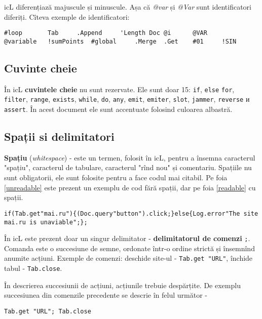 icL diferențiază majuscule și minuscule. Așa că \textit{@var} și \textit{@Var} sunt identificatori diferiți. Cîteva exemple de identificatori:

\begin{lstlisting}[numbers=none]
#loop		Tab		.Append		'Length	Doc	@i	 	@VAR
@variable	!sumPoints	#global		.Merge	.Get	#01		!SIN
\end{lstlisting}

\subsection{Cuvinte cheie}

În icL \textbf{cuvintele cheie} nu sunt rezervate. Ele sunt doar 15: \lstinline|if|, \lstinline|else| \lstinline|for|, \lstinline|filter|, \lstinline|range|, \lstinline|exists|, \lstinline|while|, \lstinline|do|, \lstinline|any|, \lstinline|emit|, \lstinline|emiter|, \lstinline|slot|, \lstinline|jammer|, \lstinline|reverse| и \lstinline|assert|. În acest document ele sunt accentuate folosind culoarea albastră.

\subsection{Spații si delimitatori}

\textbf{Spațiu} (\textit{whitespace}) - este un termen, folosit în icL, pentru a însemna caracterul "spațiu", caracterul de tabulare, caracterul "rînd nou" și comentariu. Spațiile nu sunt obligatorii, ele sunt folosite pentru a face codul mai citabil. Pe foia \ref{unreadable} este prezent un exemplu de cod fără spații, dar pe foia \ref{readable} cu spații.

\begin{lstlisting}[caption=Cod fără spații,label=unreadable]
if(Tab.get"mai.ru"){(Doc.query"button").click;}else{Log.error"The site mai.ru is unaviable";};
\end{lstlisting}

În icL este prezent doar un singur delimitator - \textbf{delimitatorul de comenzi} \lstinline|;|. Comanda este o succesiune de semne, ordonate într-o ordine strictă și însemnînd anumite acțiuni. Exemple de comenzi: deschide site-ul - \lstinline|Tab.get "URL"|, închide tabul - \lstinline|Tab.close|.

În descrierea succesiunii de acțiuni, acțiunile trebuie despărțite. De exemplu succesiunea din comenzile precedente se descrie în felul următor -
\begin{lstlisting}[numbers=none]
Tab.get "URL"; Tab.close
\end{lstlisting}

